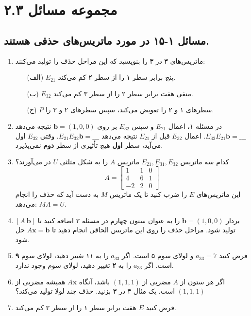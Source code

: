 \documentclass[12pt, a4paper]{book}
\begin{document}
	\newpage
	\section*{مجموعه مسائل ۲.۳}
	
	\subsection*{مسائل ۱-۱۵ در مورد ماتریس‌های حذفی هستند.}
	\begin{enumerate}
		\item ماتریس‌های ۳ در ۳ را بنویسید که این مراحل حذف را تولید می‌کنند:
		\begin{itemize}
			\item[(الف)] $E_{21}$ پنج برابر سطر ۱ را از سطر ۲ کم می‌کند.
			\item[(ب)] $E_{32}$ منفی هفت برابر سطر ۲ را از سطر ۳ کم می‌کند.
			\item[(ج)] $P$ سطرهای ۱ و ۲ را تعویض می‌کند، سپس سطرهای ۲ و ۳ را.
		\end{itemize}
		\item در مسئله ۱، اعمال $E_{21}$ و سپس $E_{32}$ بر روی $\mathbf{b}=(1,0,0)$ نتیجه می‌دهد $E_{32}E_{21}\mathbf{b} = \_\_\_$. اعمال $E_{32}$ قبل از $E_{21}$ نتیجه می‌دهد $E_{21}E_{32}\mathbf{b} = \_\_\_$. وقتی $E_{32}$ اول می‌آید، سطر \textbf{اول} هیچ تأثیری از سطر \textbf{دوم} نمی‌پذیرد.
		\item کدام سه ماتریس $E_{21}, E_{31}, E_{32}$ ماتریس $A$ را به شکل مثلثی $U$ در می‌آورند؟
		\[ A = \begin{bmatrix} 1 & 1 & 0 \\ 4 & 6 & 1 \\ -2 & 2 & 0 \end{bmatrix} \]
		این ماتریس‌های $E$ را ضرب کنید تا یک ماتریس $M$ به دست آید که حذف را انجام می‌دهد: $MA=U$.
		\item بردار $\mathbf{b}=(1,0,0)$ را به عنوان ستون چهارم در مسئله ۳ اضافه کنید تا $[A \ \mathbf{b}]$ تولید شود. مراحل حذف را روی این ماتریس الحاقی انجام دهید تا $A\mathbf{x}=\mathbf{b}$ حل شود.
		\item فرض کنید $a_{33}=7$ و لولای سوم ۵ است. اگر $a_{33}$ را به ۱۱ تغییر دهید، لولای سوم \textbf{۹} است. اگر $a_{33}$ را به \textbf{۲} تغییر دهید، لولای سوم وجود ندارد.
		\item اگر هر ستون از $A$ مضربی از $(1,1,1)$ باشد، آنگاه $A\mathbf{x}$ همیشه مضربی از $(1,1,1)$ است. یک مثال ۳ در ۳ بزنید. حذف چند لولا تولید می‌کند؟
		\item فرض کنید $E$ هفت برابر سطر ۱ را از سطر ۳ کم می‌کند.
		\begin{itemize}

\end{itemize}
\end{enumerate}
\end{document}
